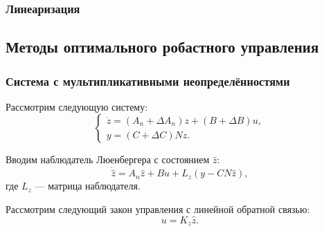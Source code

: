 \begin{frame}
	\frametitle{Линеаризация}
	\centering
\end{frame}

\subsection{Методы оптимального робастного управления}

\begin{frame}
    \frametitle{Система с мультипликативными неопределённостями}
    Рассмотрим следующую систему:
    \begin{equation}
    	\label{eq:part2_linear_dynamics}
    	\begin{cases}
    		\dot z=({A}_n+\Delta {A}_n)z + ({B}+\Delta {B})u,\\
    		y = ({C}+ \Delta {C}){N}  z.
    	\end{cases}
    \end{equation}
    
    Вводим наблюдатель Люенбергера с состоянием $\hat{z}$:
    \begin{equation}
    	\label{eq:Luenberger}
    	\dot{\hat{z}}={A}_n\hat{z}+{B}u+{L}_z(y- {C} {N}\hat{z}),
    \end{equation}
    где ${L}_z$ --- матрица наблюдателя. 
    
    Рассмотрим следующий закон управления с линейной обратной связью:
    \begin{equation}
    	\label{eq:control_law}
    	u={K}_z\hat{z}.
    \end{equation}
\end{frame}

